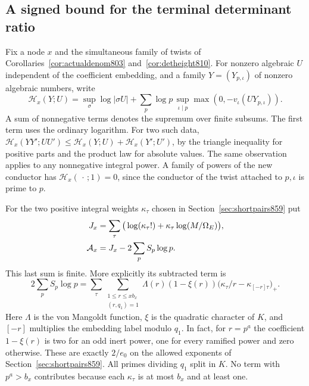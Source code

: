 \documentclass[a4paper,11pt]{article}
\theoremstyle{definition}
\theoremstyle{remark}
\numberwithin{equation}{section}
\begin{document}
\subsection{A signed bound for the terminal determinant ratio}
\label{sec:terminaldirection866}
Fix a node \(x\) and the simultaneous family of twists of
Corollaries~\ref{cor:actualdenom803} and~\ref{cor:detheight810}.
For nonzero algebraic \(U\) independent of the coefficient
embedding, and a family \(Y=(Y_{p,\iota})\) of nonzero algebraic
numbers, write
\[
 \mathcal H_x(Y;U)=\sup_\sigma\log|\sigma U|
       +\sum_p\log p\,\sup_{\iota\mid p}
                       \max(0,-v_\iota(UY_{p,\iota})).
\]
A sum of nonnegative terms denotes the supremum over finite
subsums. The first term uses the ordinary logarithm.
For two such data,
\(\mathcal H_x(YY';UU')\le\mathcal H_x(Y;U)+\mathcal H_x(Y';U')\),
by the triangle inequality for positive parts and the product
law for absolute values. The same observation applies to any
nonnegative integral power. A family of powers of the new
conductor has \(\mathcal H_x(\,\cdot\,;1)=0\), since the
conductor of the twist attached to \(p,\iota\) is prime to \(p\).

For the two positive integral weights \(\kappa_\tau\) chosen in
Section~\ref{sec:shortpairs859} put
\begin{align}
 J_x&=\sum_\tau\big(\log(\kappa_\tau!)
                         +\kappa_\tau\log(M/\Omega_E)\big),\notag\\
 \mathcal A_x&=J_x-2\sum_p S_p\log p .
 \label{eq:direction866}
\end{align}
This last sum is finite. More explicitly its subtracted term is
\begin{equation}
 2\sum_p S_p\log p
 =\sum_\tau\sum_{\substack{1\le r\le xb_x\\(r,q_1)=1}}
       \Lambda(r)(1-\xi(r))
                \big(\kappa_\tau/r-\kappa_{[-r]\tau}\big)_+ .
 \label{eq:vonmangoldt866}
\end{equation}
Here \(\Lambda\) is the von Mangoldt function, \(\xi\) is the
quadratic character of \(K\), and \([-r]\) multiplies the
embedding label modulo \(q_1\). In fact, for \(r=p^a\) the
coefficient \(1-\xi(r)\) is two for an odd inert power, one
for every ramified power and zero otherwise. These are exactly
\(2/e_0\) on the allowed exponents of Section~\ref{sec:shortpairs859}.
All primes dividing \(q_1\) split in \(K\). No term with
\(p^a>b_x\) contributes because each \(\kappa_\tau\) is
at most \(b_x\) and at least one.
\end{document}
